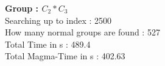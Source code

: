 \textbf{Group : $C_2*C_3$}\\
Searching up to index : 2500\\
How many normal groups are found : 527\\
Total Time in s : 489.4\\
Total Magma-Time in s : 402.63\\
